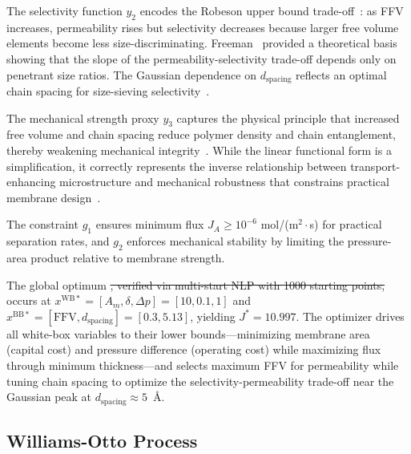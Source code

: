 \documentclass[12pt,a4paper]{article}%
\theoremstyle{plain}%
\theoremstyle{remark}%
\theoremstyle{definition}%
\def\WB{\mathrm{WB}}
\def\BB{\mathrm{BB}}
\providecommand{\DIFaddtex}[1]{{\protect\color{blue}\uwave{#1}}} %
\providecommand{\DIFdeltex}[1]{{\protect\color{red}\sout{#1}}}                      %
\providecommand{\DIFaddbegin}{} %
\providecommand{\DIFaddend}{} %
\providecommand{\DIFdelbegin}{} %
\providecommand{\DIFdelend}{} %
\providecommand{\DIFadd}[1]{\texorpdfstring{\DIFaddtex{#1}}{#1}} %
\providecommand{\DIFdel}[1]{\texorpdfstring{\DIFdeltex{#1}}{}} %
\newcommand{\DIFscaledelfig}{0.5}
\newlength{\DIFdelgraphicswidth} %
\newlength{\DIFdelgraphicsheight} %
\newcommand{\DIFaddincludegraphics}[2][]{{\color{blue}\fbox{\DIFOincludegraphics[#1]{#2}}}} %
\newcommand{\DIFdelincludegraphics}[2][]{%
\sbox{\DIFdelgraphicsbox}{\DIFOincludegraphics[#1]{#2}}%
\settoboxwidth{\DIFdelgraphicswidth}{\DIFdelgraphicsbox} %
\settoboxtotalheight{\DIFdelgraphicsheight}{\DIFdelgraphicsbox} %
\scalebox{\DIFscaledelfig}{%
\parbox[b]{\DIFdelgraphicswidth}{\usebox{\DIFdelgraphicsbox}\\[-\baselineskip] \rule{\DIFdelgraphicswidth}{0em}}\llap{\resizebox{\DIFdelgraphicswidth}{\DIFdelgraphicsheight}{%
\setlength{\unitlength}{\DIFdelgraphicswidth}%
\begin{picture}(1,1)%
\thicklines\linethickness{2pt} %
{\color[rgb]{1,0,0}\put(0,0){\framebox(1,1){}}}%
{\color[rgb]{1,0,0}\put(0,0){\line( 1,1){1}}}%
{\color[rgb]{1,0,0}\put(0,1){\line(1,-1){1}}}%
\end{picture}%
}\hspace*{3pt}}} %
} %
\DeclareRobustCommand{\DIFaddbegin}{\DIFOaddbegin \let\includegraphics\DIFaddincludegraphics} %
\DeclareRobustCommand{\DIFaddend}{\DIFOaddend \let\includegraphics\DIFOincludegraphics} %
\DeclareRobustCommand{\DIFdelbegin}{\DIFOdelbegin \let\includegraphics\DIFdelincludegraphics} %
\DeclareRobustCommand{\DIFdelend}{\DIFOaddend \let\includegraphics\DIFOincludegraphics} %
\begin{document}
\begin{appendices}
The selectivity function $y_2$ encodes the Robeson upper bound trade-off~\cite{robeson1991correlation,robeson2008upper}: as FFV increases, permeability rises but selectivity decreases because larger free volume elements become less size-discriminating. Freeman~\cite{freeman1999basis} provided a theoretical basis showing that the slope of the permeability-selectivity trade-off depends only on penetrant size ratios. The Gaussian dependence on $d_{\text{spacing}}$ reflects an optimal chain spacing for size-sieving selectivity~\cite{park2017maximizing}.

The mechanical strength proxy $y_3$ captures the physical principle that increased free volume and chain spacing reduce polymer density and chain entanglement, thereby weakening mechanical integrity~\cite{bondi1964van}. While the linear functional form is a simplification, it correctly represents the inverse relationship between transport-enhancing microstructure and mechanical robustness that constrains practical membrane design~\cite{chiwaye2025superstructure}.

The constraint $g_1$ ensures minimum flux $J_A \geq 10^{-6}$ mol/(m$^2\cdot$s) for practical separation rates, and $g_2$ enforces mechanical stability by limiting the pressure-area product relative to membrane strength.

The global optimum \DIFdelbegin \DIFdel{, verified via multi-start NLP with 1000 starting points, }\DIFdelend \DIFaddbegin \DIFadd{for parameters in Table~\ref{tab:membrane_vars} }\DIFaddend occurs at $x^{\WB*} = [A_m, \delta, \Delta p] = [10, 0.1, 1]$ and $x^{\BB*} = [\text{FFV}, d_{\text{spacing}}] = [0.3, 5.13]$, yielding $J^* = 10.997$. The optimizer drives all white-box variables to their lower bounds---minimizing membrane area (capital cost) and pressure difference (operating cost) while maximizing flux through minimum thickness---and selects maximum FFV for permeability while tuning chain spacing to optimize the selectivity-permeability trade-off near the Gaussian peak at $d_{\text{spacing}} \approx 5$~\AA.

\subsection{Williams-Otto Process}\label{subsec:app_williams_otto}


\end{appendices}
\end{document}

